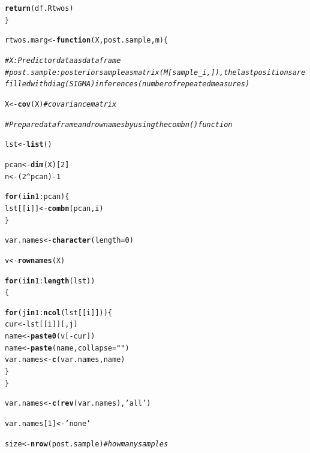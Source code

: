 \documentclass[11pt,a4paper,twoside]{book}\usepackage[]{graphicx}\usepackage[]{color}
\makeatletter
\newcommand{\hlnum}[1]{\textcolor[rgb]{0.686,0.059,0.569}{#1}}%
\newcommand{\hlstr}[1]{\textcolor[rgb]{0.192,0.494,0.8}{#1}}%
\newcommand{\hlcom}[1]{\textcolor[rgb]{0.678,0.584,0.686}{\textit{#1}}}%
\newcommand{\hlopt}[1]{\textcolor[rgb]{0,0,0}{#1}}%
\newcommand{\hlstd}[1]{\textcolor[rgb]{0.345,0.345,0.345}{#1}}%
\newcommand{\hlkwa}[1]{\textcolor[rgb]{0.161,0.373,0.58}{\textbf{#1}}}%
\newcommand{\hlkwb}[1]{\textcolor[rgb]{0.69,0.353,0.396}{#1}}%
\newcommand{\hlkwc}[1]{\textcolor[rgb]{0.333,0.667,0.333}{#1}}%
\newcommand{\hlkwd}[1]{\textcolor[rgb]{0.737,0.353,0.396}{\textbf{#1}}}%
\newenvironment{kframe}{%
 \def\at@end@of@kframe{}%
 \ifinner\ifhmode%
  \def\at@end@of@kframe{\end{minipage}}%
  \begin{minipage}{\columnwidth}%
 \fi\fi%
 \def\FrameCommand##1{\hskip\@totalleftmargin \hskip-\fboxsep
 \colorbox{shadecolor}{##1}\hskip-\fboxsep
     \hskip-\linewidth \hskip-\@totalleftmargin \hskip\columnwidth}%
 \MakeFramed {\advance\hsize-\width
   \@totalleftmargin\z@ \linewidth\hsize
   \@setminipage}}%
 {\par\unskip\endMakeFramed%
 \at@end@of@kframe}
\newenvironment{knitrout}{}{} %
\makeatother
\begin{document}
\begin{knitrout}
\begin{kframe}
\begin{alltt}
        \hlkwd{return}\hlstd{(df.Rtwos)}
\hlstd{\}}



\hlstd{rtwos.marg}\hlkwb{<-}\hlkwa{function}\hlstd{(}\hlkwc{X}\hlstd{,} \hlkwc{post.sample}\hlstd{,} \hlkwc{m}\hlstd{)\{}

        \hlcom{# X: Predictor data as data frame}
        \hlcom{# post.sample: posterior sample as matrix (M[sample_i,]), the last positions are filled with diag(SIGMA) inferences (number of repeated measures)}

        \hlstd{X} \hlkwb{<-} \hlkwd{cov}\hlstd{(X)} \hlcom{#covariance matrix}

        \hlcom{#Prepare data frame and rownames by using the combn() function}

        \hlstd{lst} \hlkwb{<-} \hlkwd{list}\hlstd{()}

        \hlstd{pcan} \hlkwb{<-} \hlkwd{dim}\hlstd{(X)[}\hlnum{2}\hlstd{]}
        \hlstd{n} \hlkwb{<-} \hlstd{(}\hlnum{2}\hlopt{^}\hlstd{pcan)}\hlopt{-}\hlnum{1}

        \hlkwa{for} \hlstd{(i} \hlkwa{in} \hlnum{1}\hlopt{:}\hlstd{pcan)\{}
                \hlstd{lst[[i]]} \hlkwb{<-} \hlkwd{combn}\hlstd{(pcan,i)}
        \hlstd{\}}

        \hlstd{var.names} \hlkwb{<-} \hlkwd{character}\hlstd{(}\hlkwc{length} \hlstd{=} \hlnum{0}\hlstd{)}

        \hlstd{v}\hlkwb{<-} \hlkwd{rownames}\hlstd{(X)}

        \hlkwa{for}\hlstd{(i} \hlkwa{in} \hlnum{1}\hlopt{:}\hlkwd{length}\hlstd{(lst))}
        \hlstd{\{}

                \hlkwa{for} \hlstd{(j} \hlkwa{in} \hlnum{1}\hlopt{:}\hlkwd{ncol}\hlstd{(lst[[i]]))\{}
                        \hlstd{cur}\hlkwb{<-} \hlstd{lst[[i]][,j]}
                        \hlstd{name} \hlkwb{<-} \hlkwd{paste0}\hlstd{(v[}\hlopt{-}\hlstd{cur])}
                        \hlstd{name} \hlkwb{<-} \hlkwd{paste}\hlstd{(name,} \hlkwc{collapse} \hlstd{=} \hlstr{" "}\hlstd{)}
                        \hlstd{var.names} \hlkwb{<-} \hlkwd{c}\hlstd{(var.names, name)}
                \hlstd{\}}
        \hlstd{\}}

        \hlstd{var.names}\hlkwb{<-}\hlkwd{c}\hlstd{(}\hlkwd{rev}\hlstd{(var.names),} \hlstr{'all'}\hlstd{)}

        \hlstd{var.names[}\hlnum{1}\hlstd{]}\hlkwb{<-}\hlstr{'none'}

        \hlstd{size} \hlkwb{<-} \hlkwd{nrow}\hlstd{(post.sample)}  \hlcom{# how many samples}


\end{alltt}
\end{kframe}
\end{knitrout}
\end{document}
